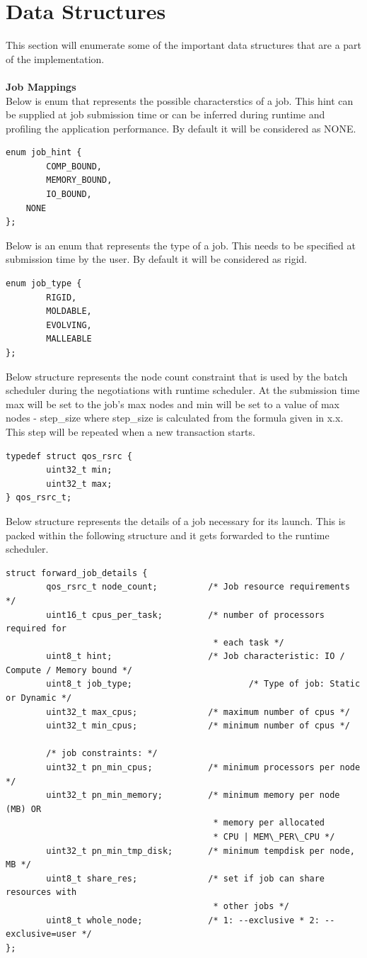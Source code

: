 \section{Data Structures}
This section will enumerate some of the important data structures that are a part of the implementation.\\ \\
\lstset{breaklines=true}
\textbf{Job Mappings}\\
Below is enum that represents the possible characterstics of a job. This hint can be supplied at job submission time or can be inferred during runtime and profiling the application performance. By default it will be considered as NONE.
\begin{lstlisting}[mathescape]
enum job_hint {
        COMP_BOUND,
        MEMORY_BOUND,
        IO_BOUND,
	NONE
};
\end{lstlisting}
Below is an enum that represents the type of a job. This needs to be specified at submission time by the user. By default it will be considered as rigid.
\begin{lstlisting}[mathescape]
enum job_type {
        RIGID,
        MOLDABLE,
        EVOLVING,
        MALLEABLE
};
\end{lstlisting}
Below structure represents the node count constraint that is used by the batch scheduler during the negotiations with runtime scheduler. At the submission time max will be set to the job's max nodes and min will be set to a value of max nodes - step\_size where step\_size is calculated from the formula given in x.x. This step will be repeated when a new transaction starts.
\begin{lstlisting}[mathescape]
typedef struct qos_rsrc {   
        uint32_t min;
        uint32_t max;
} qos_rsrc_t;
\end{lstlisting}
Below structure represents the details of a job necessary for its launch. This is packed within the following structure and it gets forwarded to the runtime scheduler.
\begin{lstlisting}[mathescape]
struct forward_job_details {
        qos_rsrc_t node_count;          /* Job resource requirements */
        uint16_t cpus_per_task;         /* number of processors required for
                                         * each task */
        uint8_t hint;                   /* Job characteristic: IO / Compute / Memory bound */
        uint8_t job_type;                       /* Type of job: Static or Dynamic */
        uint32_t max_cpus;              /* maximum number of cpus */
        uint32_t min_cpus;              /* minimum number of cpus */

        /* job constraints: */
        uint32_t pn_min_cpus;           /* minimum processors per node */
        uint32_t pn_min_memory;         /* minimum memory per node (MB) OR
                                         * memory per allocated
                                         * CPU | MEM\_PER\_CPU */
        uint32_t pn_min_tmp_disk;       /* minimum tempdisk per node, MB */
        uint8_t share_res;              /* set if job can share resources with
                                         * other jobs */
        uint8_t whole_node;             /* 1: --exclusive * 2: --exclusive=user */
};
\end{lstlisting}
